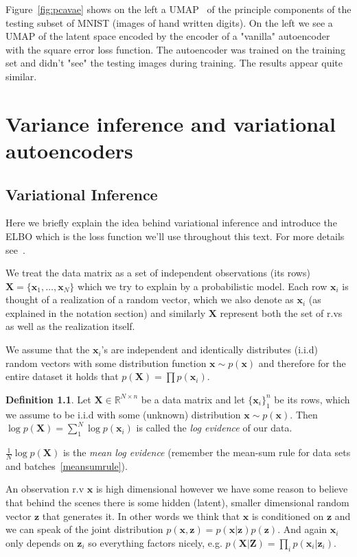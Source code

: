 \documentclass[11pt, a4paper]{report}
\theoremstyle{plain}
\theoremstyle{definition}
\newtheorem{mydef}{Definition}[chapter]
\theoremstyle{remark}
\newcommand{\R}{\mathbb{R}}
\newcommand{\X}{\mathbf{X}}
\newcommand{\x}{\mathbf{x}}
\newcommand{\Z}{\mathbf{Z}}
\newcommand{\z}{\mathbf{z}}
\newcommand{\bv}[1]{\boldsymbol{#1}}
\begin{document}
Figure~\ref{fig:pcavae} shows on the left a
UMAP~\cite{mcinnes2018umap} of the principle components of the testing subset of
MNIST (images of hand written digits). On the left we see a UMAP of the latent
space encoded by the encoder of a "vanilla" autoencoder with the square error loss
function. The autoencoder was
trained on the training set and didn't "see" the testing images during training.
The results appear quite similar.

\chapter{Variance inference and variational autoencoders}
\section{Variational Inference}

Here we briefly explain the idea behind variational inference and introduce the
ELBO which is the loss function we'll use throughout this text.
For more details see~.

We treat the data matrix as a set of independent observations (its rows)
$\bv{X} = \{\bv{x}_1, \dots
, \bv{x}_N\}$ which we try to explain by a probabilistic model. 
Each row $\x_i$ is thought of a realization of a random vector, which we also 
denote as $\x_i$ (as explained in the notation section) and similarly $\X$
represent both the set of r.vs as well as the realization itself.

We assume that
the $\bv{x}_i$'s are independent and identically distributes (i.i.d) random vectors
with some distribution function $\x \sim p(\x)$ and therefore for
the entire dataset it holds that $p(\bv{X}) = \prod p(\bv{x}_i)$.

\begin{mydef}
\label{def:logevidence}
Let $\bv{X} \in \R^{N \times n}$ be a data matrix and let $\{\bv{x}_i\}_1^n$ be its
rows,
which we assume to be i.i.d with some (unknown) distribution $\x \sim p(\bv{x})$.
Then $\log p(\bv{X}) = \sum_1^N \log p(\bv{x}_i)$ is called the \emph{log evidence} of our
data.

$\frac{1}{N}\log p(\X)$ is the \emph{mean log evidence} (remember the
mean-sum rule for data sets and
batches~\ref{meansumrule}).
\end{mydef}

An observation r.v $\bv{x}$ is high dimensional however
we have some reason to believe that behind the scenes there is some hidden
(latent), smaller dimensional random vector $\z$ that generates it.
In other words we think that $\x$ is conditioned on $\z$ and we can speak of
the joint distribution $p(\x,\z) = p(\x | \z)p(\z)$.
And again $\x_i$ only depends on $\z_i$ so everything factors nicely, e.g. 
$p(\X | \Z) = \prod_i p(\x_i | \z_i)$.
\end{document}
